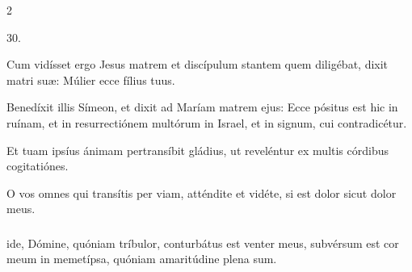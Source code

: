 \documentclass[9pt,twoside]{extarticle}
\begin{document}
\begin{multicols}{2}
\begin{tightlist}{}
\item {} 30.
\item {} Cum vidísset ergo Jesus matrem et discípulum stantem quem diligébat, dixit matri suæ: Múlier ecce fílius tuus.
\item {} Benedíxit illis Símeon, et dixit ad Maríam matrem ejus: Ecce pósitus est hic in ruínam, et in resurrectiónem multórum in Israel, et in signum, cui contradicétur.
\item {} Et tuam ipsíus ánimam pertransíbit gládius, ut reveléntur ex multis córdibus cogitatiónes.
\item {} O vos omnes qui transítis per viam, atténdite et vidéte, si est dolor sicut dolor meus.
\end{tightlist}

\subsubsection*{}
ide, Dómine, quóniam tríbulor, conturbátus est venter meus, subvérsum est cor meum in memetípsa, quóniam amaritúdine plena sum.


\end{multicols}
\end{document}
